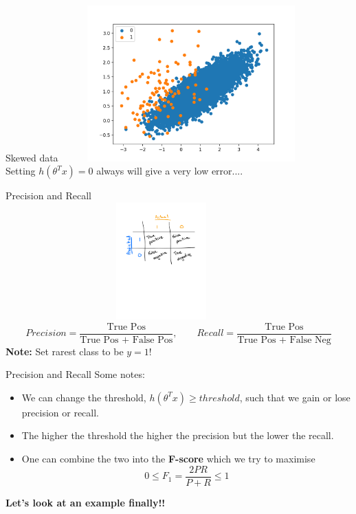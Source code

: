 \documentclass[usenames,dvipsnames]{beamer}
\begin{document}
\begin{frame}{Skewed data} 
\centering
    \includegraphics[width=10cm,height=6cm]{figs/skewed.png}  \\ 
    Setting $h(\theta^T x) = 0$ always will give a very low error....
\end{frame}

\begin{frame}{Precision and Recall} 
\centering
    \includegraphics[width=12cm,height=4.5cm]{figs/pandr.pdf}  \\ 
    
    \begin{equation}
    Precision = \frac{\text{True Pos}}{\text{True Pos + False Pos}} , \quad \quad     Recall = \frac{\text{True Pos}}{\text{True Pos + False Neg}}
    \end{equation}
    {\bf Note:} Set rarest class to be $y=1$!
\end{frame}

\begin{frame}{Precision and Recall} 
Some notes:
\begin{itemize}
\item
We can change the threshold, $h(\theta^Tx)\geq threshold$, such that we gain or lose precision or recall.  \pause
\item 
The higher the threshold the higher the precision but the lower the recall. 
\item
One can combine the two into the {\bf \color{orange} F-score} which we try to maximise
\begin{equation}
0 \leq F_1 = \frac{ 2PR}{P+R} \leq 1
\end{equation}
\end{itemize}
\pause
{\bf Let's look at an example finally!!}

\end{frame}
\end{document}
